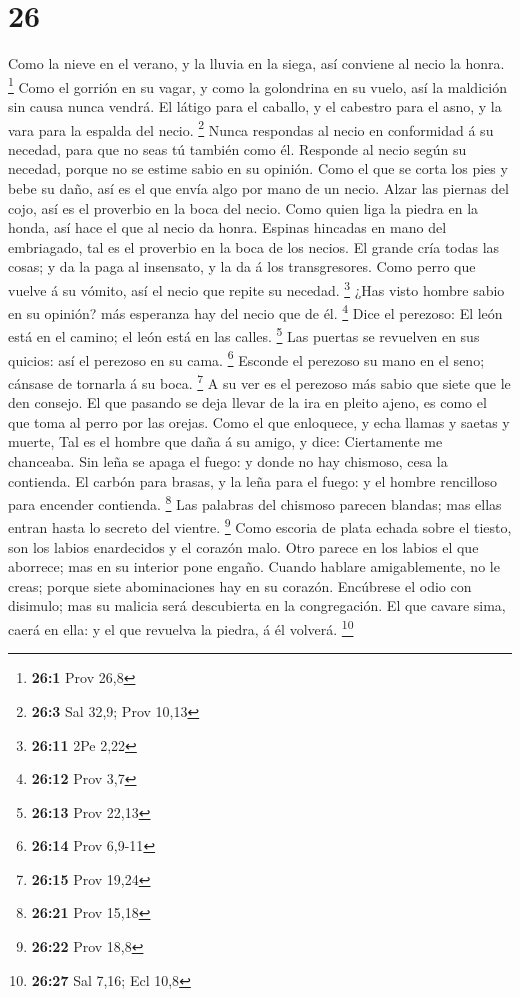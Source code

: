 \hypertarget{section-25}{%
\section{26}\label{section-25}}

 Como la nieve en el verano, y la lluvia en la siega, así
conviene al necio la honra. \footnote{\textbf{26:1} Prov 26,8}
 Como el gorrión en su vagar, y como la golondrina en su
vuelo, así la maldición sin causa nunca vendrá.  El látigo
para el caballo, y el cabestro para el asno, y la vara para la espalda
del necio. \footnote{\textbf{26:3} Sal 32,9; Prov 10,13} 
Nunca respondas al necio en conformidad á su necedad, para que no seas
tú también como él.  Responde al necio según su necedad,
porque no se estime sabio en su opinión.  Como el que se
corta los pies y bebe su daño, así es el que envía algo por mano de un
necio.  Alzar las piernas del cojo, así es el proverbio en
la boca del necio.  Como quien liga la piedra en la honda,
así hace el que al necio da honra.  Espinas hincadas en mano
del embriagado, tal es el proverbio en la boca de los necios.
 El grande cría todas las cosas; y da la paga al insensato,
y la da á los transgresores.  Como perro que vuelve á su
vómito, así el necio que repite su necedad. \footnote{\textbf{26:11} 2Pe
  2,22}  ¿Has visto hombre sabio en su opinión? más
esperanza hay del necio que de él. \footnote{\textbf{26:12} Prov 3,7}
 Dice el perezoso: El león está en el camino; el león está
en las calles. \footnote{\textbf{26:13} Prov 22,13}  Las
puertas se revuelven en sus quicios: así el perezoso en su cama.
\footnote{\textbf{26:14} Prov 6,9-11}  Esconde el perezoso
su mano en el seno; cánsase de tornarla á su boca. \footnote{\textbf{26:15}
  Prov 19,24}  A su ver es el perezoso más sabio que siete
que le den consejo.  El que pasando se deja llevar de la
ira en pleito ajeno, es como el que toma al perro por las orejas.
 Como el que enloquece, y echa llamas y saetas y muerte,
 Tal es el hombre que daña á su amigo, y dice: Ciertamente
me chanceaba.  Sin leña se apaga el fuego: y donde no hay
chismoso, cesa la contienda.  El carbón para brasas, y la
leña para el fuego: y el hombre rencilloso para encender contienda.
\footnote{\textbf{26:21} Prov 15,18}  Las palabras del
chismoso parecen blandas; mas ellas entran hasta lo secreto del vientre.
\footnote{\textbf{26:22} Prov 18,8}  Como escoria de plata
echada sobre el tiesto, son los labios enardecidos y el corazón malo.
 Otro parece en los labios el que aborrece; mas en su
interior pone engaño.  Cuando hablare amigablemente, no le
creas; porque siete abominaciones hay en su corazón. 
Encúbrese el odio con disimulo; mas su malicia será descubierta en la
congregación.  El que cavare sima, caerá en ella: y el que
revuelva la piedra, á él volverá. \footnote{\textbf{26:27} Sal 7,16; Ecl
  10,8}

